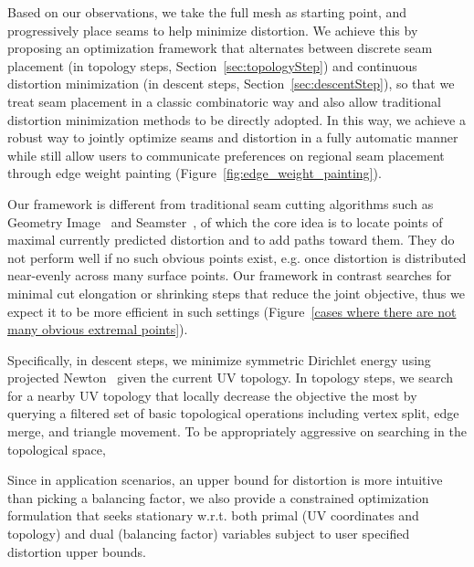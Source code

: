 Based on our observations, we take the full mesh as starting point, and progressively place seams to help minimize distortion. We achieve this by proposing an optimization framework that alternates between discrete seam placement (in topology steps, Section~\ref{sec:topologyStep}) and continuous distortion minimization (in descent steps, Section~\ref{sec:descentStep}), so that we treat seam placement in a classic combinatoric way and also allow traditional distortion minimization methods to be directly adopted. In this way, we achieve a robust way to jointly optimize seams and distortion in a fully automatic manner while still allow users to communicate preferences on regional seam placement through edge weight painting (Figure~\ref{fig:edge_weight_painting}).

Our framework is different from traditional seam cutting algorithms such as Geometry Image~\cite{Gu2002Geometry} and Seamster~\cite{Sheffer2002Seamster}, of which the core idea is to locate points of maximal currently predicted distortion and to add paths toward them. They do not perform well if no such obvious points exist, e.g. once distortion is distributed near-evenly across many surface points. Our framework in contrast searches for minimal cut elongation or shrinking steps that reduce the joint objective, thus we expect it to be more efficient in such settings (Figure~\ref{cases where there are not many obvious extremal points}).

Specifically, in descent steps, we minimize symmetric Dirichlet energy using projected Newton~\cite{Teran2005Robust} given the current UV topology. In topology steps, we search for a nearby UV topology that locally decrease the objective the most by querying a filtered set of basic topological operations including vertex split, edge merge, and triangle movement. To be appropriately aggressive on searching in the topological space, 

Since in application scenarios, an upper bound for distortion is more intuitive than picking a balancing factor, we also provide a constrained optimization formulation that seeks stationary w.r.t. both primal (UV coordinates and topology) and dual (balancing factor) variables subject to user specified distortion upper bounds. 

